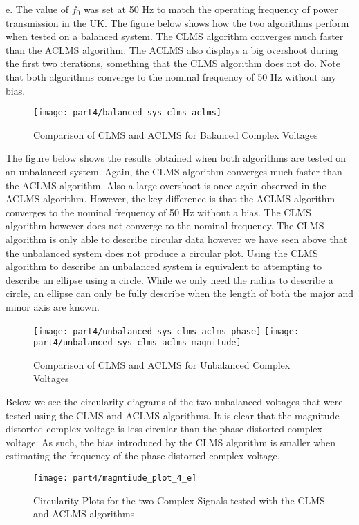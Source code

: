 \newpage
\noindent{}e. The value of $f_0$ was set at 50 Hz to match the operating frequency of power transmission in the UK. The figure below shows how the two algorithms perform when tested on a balanced system. The CLMS algorithm converges much faster than the ACLMS algorithm. The ACLMS also displays a big overshoot during the first two iterations, something that the CLMS algorithm does not do. Note that both algorithms converge to the nominal frequency of 50 Hz without any bias.

\begin{figure}[H]
\centering{}
\texttt{[image: part4/balanced\_sys\_clms\_aclms]}
\caption{Comparison of CLMS and ACLMS for Balanced Complex Voltages}
\end{figure}

\noindent{}The figure below shows the results obtained when both algorithms are tested on an unbalanced system. Again, the CLMS algorithm converges much faster than the ACLMS algorithm. Also a large overshoot is once again observed in the ACLMS algorithm. However, the key difference is that the ACLMS algorithm converges to the nominal frequency of 50 Hz without a bias. The CLMS algorithm however does not converge to the nominal frequency. The CLMS algorithm is only able to describe circular data however we have seen above that the unbalanced system does not produce a circular plot. Using the CLMS algorithm to describe an unbalanced system is equivalent to attempting to describe an ellipse using a circle. While we only need the radius to describe a circle, an ellipse can only be fully describe when the length of both the major and minor axis are known.

\begin{figure}[H]
\centering{}
\texttt{[image: part4/unbalanced\_sys\_clms\_aclms\_phase]}
\texttt{[image: part4/unbalanced\_sys\_clms\_aclms\_magnitude]}
\caption{Comparison of CLMS and ACLMS for Unbalanced Complex Voltages}
\label{fig:unbalanced}
\end{figure}

\noindent{}Below we see the circularity diagrams of the two unbalanced voltages that were tested using the CLMS and ACLMS algorithms. It is clear that the magnitude distorted complex voltage is less circular than the phase distorted complex voltage. As such, the bias introduced by the CLMS algorithm is smaller when estimating the frequency of the phase distorted complex voltage.

\begin{figure}[H]
\centering{}
\texttt{[image: part4/magntiude\_plot\_4\_e]}
\caption{Circularity Plots for the two Complex Signals tested with the CLMS and ACLMS algorithms}
\end{figure}

